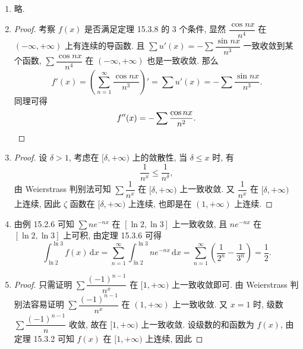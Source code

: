 % 
\begin{enumerate}
    \item %
        略.
    \item %
        \begin{proof}
            考察 $f(x)$ 是否满足定理 15.3.8 的 3 个条件, 显然 $\dfrac{\cos{nx}}{n^4}$ 在 $(-\infty, +\infty)$ 上有连续的导函数.
            且 $\sum u'(x) = -\sum{\dfrac{\sin{nx}}{n^3}}$ 一致收敛到某个函数, $\sum{\dfrac{\cos{nx}}{n^4}}$ 在 $(-\infty, +\infty)$ 也是一致收敛.
            那么
            \[
                f'(x) = \left(\sum_{n=1}^\infty{\frac{\cos{nx}}{n^3}}\right)' = \sum{u'(x)} = -\sum{\dfrac{\sin{nx}}{n^3}}.   
            \]
            同理可得
            \[
                f''(x) = -\sum{\frac{\cos{nx}}{n^2}}. \qedhere    
            \]
        \end{proof}
    \item %
        \begin{proof}
            设 $\delta > 1$, 考虑在 $[\delta, +\infty)$ 上的敛散性, 当 $\delta \leq x$ 时, 有
            \[
                \frac{1}{n^x} \leq \frac{1}{n^\delta},    
            \]
            由 Weierstrass 判别法可知 $\sum\dfrac{1}{n^x}$ 在 $[\delta, +\infty)$ 上一致收敛.
            又 $\dfrac{1}{n^x}$ 在 $[\delta, +\infty)$ 上连续, 因此 $\zeta$ 函数在 $[\delta, +\infty)$ 上连续, 也即是在 $(1, +\infty)$ 上连续.
        \end{proof}
    \item %
        由例 15.2.6 可知 $\sum{ne^{-nx}}$ 在 $[\ln2, \ln3]$ 上一致收敛, 且 $ne^{-nx}$ 在 $[\ln2, \ln3]$ 上可积, 由定理 15.3.6 可得
        \[
            \int_{\ln2}^{\ln3}f(x)\,\mathrm{d}x = \sum_{n=1}^\infty\int_{\ln2}^{\ln3}ne^{-nx}\,\mathrm{d}x = \sum_{n=1}^\infty\left(\frac{1}{2^n} - \frac{1}{3^n}\right) = \frac12.   
        \]
    \item %
        \begin{proof}
            只需证明 $\sum{\dfrac{(-1)^{n-1}}{n^x}}$ 在 $[1, +\infty)$ 上一致收敛即可. 由 Weierstrass 判别法容易证明 $\sum{\dfrac{(-1)^{n-1}}{n^x}}$ 在 $(1, +\infty)$ 上一致收敛.
            又 $x = 1$ 时, 级数 $\sum{\dfrac{(-1)^{n-1}}{n}}$ 收敛, 故在 $[1, +\infty)$ 上一致收敛. 设级数的和函数为 $f(x)$, 由定理 15.3.2 可知 $f(x)$ 在 $[1, +\infty)$ 上连续, 因此

\end{proof}
\end{enumerate}
